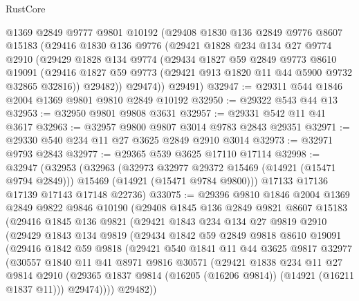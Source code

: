 \begin{lexlean}{RustCore}
\begin{coremodule}
    @1369
    @2849
    @9777
    @9801
    @10192
    (@29408
      @1830
      @136
      @2849
      @9776
      @8607
      @15183
      (@29416
        @1830
        @136
        @9776
        (@29421
          @1828
          @234
          @134
          @27
          @9774
          @2910
          (@29429
            @1828
            @134
            @9774
            (@29434
              @1827
              @59
              @2849
              @9773
              @8610
              @19091
              (@29416 @1827 @59 @9773 (@29421 @913 @1820 @11 @44 @5900 @9732 @32865 @32816))
              @29482))
          @29474))
      @29491)
@32947 := @29311 @544 @1846 @2004 @1369 @9801 @9810 @2849 @10192
@32950 := @29322 @543 @44 @13
@32953 := @32950 @9801 @9808 @3631
@32957 := @29331 @542 @11 @41 @3617
@32963 := @32957 @9800 @9807 @3014 @9783 @2843 @29351
@32971 := @29330 @540 @234 @11 @27 @3625 @2849 @2910 @3014
@32973 := @32971 @9793 @2843
@32977 := @29365 @539 @3625 @17110 @17114
@32998 := @32947
    (@32953
      (@32963
        (@32973 @32977 @29372 @15469 (@14921 (@15471 @9794 @2849)))
        @15469
        (@14921 (@15471 @9784 @9800)))
      @17133
      @17136
      @17139
      @17143
      @17148
      @22736)
@33075 := @29396
    @9810
    @1846
    @2004
    @1369
    @2849
    @9822
    @9846
    @10190
    (@29408
      @1845
      @136
      @2849
      @9821
      @8607
      @15183
      (@29416
        @1845
        @136
        @9821
        (@29421
          @1843
          @234
          @134
          @27
          @9819
          @2910
          (@29429
            @1843
            @134
            @9819
            (@29434
              @1842
              @59
              @2849
              @9818
              @8610
              @19091
              (@29416
                @1842
                @59
                @9818
                (@29421
                  @540
                  @1841
                  @11
                  @44
                  @3625
                  @9817
                  @32977
                  (@30557
                    @1840
                    @11
                    @41
                    @8971
                    @9816
                    @30571
                    (@29421
                      @1838
                      @234
                      @11
                      @27
                      @9814
                      @2910
                      (@29365 @1837 @9814 (@16205 (@16206 @9814)) (@14921 (@16211 @1837 @11)))
                      @29474))))
              @29482))

\end{coremodule}
\end{lexlean}
